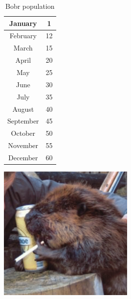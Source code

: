 \documentclass{article}
\begin{document}
\begin{table}[h]
\centering
\caption{Bobr population}
\begin{tabular}{|c|c|}
\hline
January & 1\\ \hline
February & 12\\ \hline
March & 15\\ \hline
April & 20\\ \hline
May & 25\\ \hline
June & 30\\ \hline
July & 35\\ \hline
August & 40\\ \hline
September & 45\\ \hline
October & 50\\ \hline
November & 55\\ \hline
December & 60\\ \hline
\end{tabular}
\end{table}
\includegraphics[width=0.5\textwidth]{bobr.png}
\end{document}
